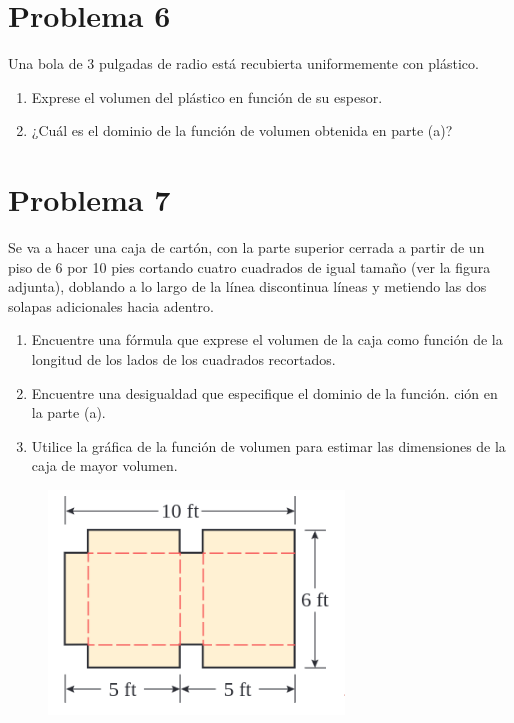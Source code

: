 \documentclass[12pt]{article}
\begin{document}
\section{Problema 6}
Una bola de 3 pulgadas de radio está recubierta uniformemente con plástico.
\begin{enumerate}[label=\alph*)]
\item  Exprese el volumen del plástico en función de su espesor.
\item  ¿Cuál es el dominio de la función de volumen obtenida en
parte (a)?
\end{enumerate}

\section{Problema 7}
Se va a hacer una caja de cartón, con la parte superior cerrada a partir de un piso de 6 por 10 pies cortando cuatro cuadrados de igual tamaño (ver la figura adjunta), doblando a lo largo de la línea discontinua
líneas y metiendo las dos solapas adicionales hacia adentro.
\begin{enumerate}[label=\alph*)]
\item Encuentre una fórmula que exprese el volumen de la caja como
función de la longitud de los lados de los cuadrados recortados.
\item Encuentre una desigualdad que especifique el dominio de la función.
ción en la parte (a).
\item Utilice la gráfica de la función de volumen para estimar las dimensiones de la caja de mayor volumen.
\end{enumerate}

\begin{figure}[h]
\centering
\includegraphics[width=0.7\textwidth]{img/prob7.png}
\end{figure}
\end{document}
